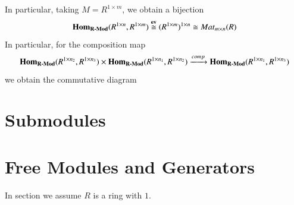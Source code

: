 \documentclass[12pt, a4paper, oneside, openright, titlepage]{book}
\begin{document}
\begin{rmk}
    In particular, taking $M = R^{1\times m}$, we obtain a bijection \begin{equation}
        \mathbf{Hom}_{\normalfont\textbf{R-Mod}}(R^{1\times n},R^{1\times m}) \overset{\operatorname{\bf{ev}}}{\cong} (R^{1\times m})^{1\times n} \cong Mat_{m\times n}(R)
    \end{equation}
    In particular, for the composition map \begin{equation}
        \mathbf{Hom}_{\normalfont\textbf{R-Mod}}(R^{1\times n_2},R^{1\times n_3}) \times \mathbf{Hom}_{\normalfont\textbf{R-Mod}}(R^{1\times n_1},R^{1\times n_2}) \xrightarrow{comp} \mathbf{Hom}_{\normalfont\textbf{R-Mod}}(R^{1\times n_1},R^{1\times n_3})
    \end{equation}
    we obtain the commutative diagram 
        \begin{center}
        \end{center}
\end{rmk}


\section{\textsection Submodules}


\section{\textsection Free Modules and Generators}

In section we assume $R$ is a ring with $1$. 
\end{document}
